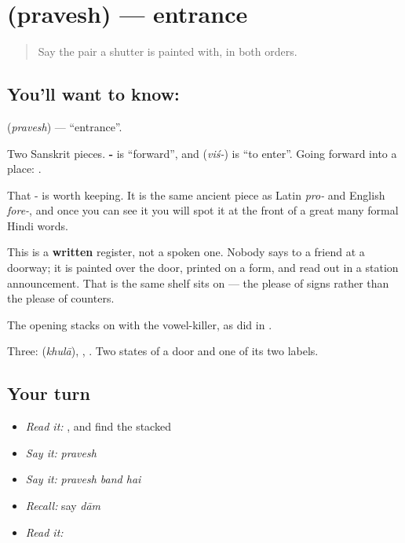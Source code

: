 \section[\texorpdfstring{\hi{प्रवेश} (pravesh)}{प्रवेश (pravesh)}]{ (pravesh) — entrance}

\label{lesson:HI-C74-entrance}



\begin{quote}
Say the pair a shutter is painted with, in both orders.
\end{quote}

\subsection*{You'll want to know: }
\textbf{} (\emph{pravesh}) — \textquotedblleft{}entrance\textquotedblright{}.

Two Sanskrit pieces. \textbf{-} is \textquotedblleft{}forward\textquotedblright{}, and \textbf{} (\emph{viś-}) is \textquotedblleft{}to enter\textquotedblright{}. Going forward into a place: .

That - is worth keeping. It is the same ancient piece as Latin \emph{pro-} and English \emph{fore-}, and once you can see it you will spot it at the front of a great many formal Hindi words.

This is a \textbf{written} register, not a spoken one. Nobody says  to a friend at a doorway; it is painted over the door, printed on a form, and read out in a station announcement. That is the same shelf \textbf{} sits on — the please of signs rather than the please of counters.

The opening  stacks  on  with the vowel-killer, as  did in .

\begin{grammarlens}[title={What you've built}]
Three: \textbf{} (\emph{khulā}), , . Two states of a door and one of its two labels.
\end{grammarlens}

\subsection*{Your turn}
\begin{itemize}
\raggedright
  \item \emph{Read it:} , and find the stacked 
  \item \emph{Say it:} \emph{pravesh}
  \item \emph{Say it:} \emph{pravesh band hai}
  \item \emph{Recall:} say \emph{dām}
  \item \emph{Read it:} \textbf{}
\end{itemize}

